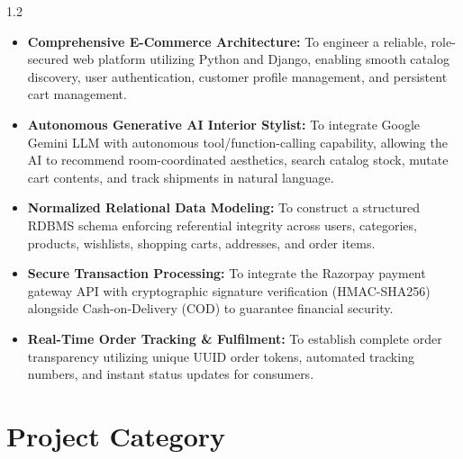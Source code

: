 \documentclass[12pt,a4paper]{article}
\begin{document}
{\begin{spacing}{1.2}
\begin{itemize}
    \setlength{\itemsep}{4pt}
    \setlength{\parskip}{0pt}
    \item \textbf{Comprehensive E-Commerce Architecture:} To engineer a reliable, role-secured web platform utilizing Python and Django, enabling smooth catalog discovery, user authentication, customer profile management, and persistent cart management.
    \item \textbf{Autonomous Generative AI Interior Stylist:} To integrate Google Gemini LLM with autonomous tool/function-calling capability, allowing the AI to recommend room-coordinated aesthetics, search catalog stock, mutate cart contents, and track shipments in natural language.
    \item \textbf{Normalized Relational Data Modeling:} To construct a structured RDBMS schema enforcing referential integrity across users, categories, products, wishlists, shopping carts, addresses, and order items.
    \item \textbf{Secure Transaction Processing:} To integrate the Razorpay payment gateway API with cryptographic signature verification (HMAC-SHA256) alongside Cash-on-Delivery (COD) to guarantee financial security.
    \item \textbf{Real-Time Order Tracking \& Fulfilment:} To establish complete order transparency utilizing unique UUID order tokens, automated tracking numbers, and instant status updates for consumers.
\end{itemize}

\end{spacing}
}

\vfill

\newpage



\section{Project Category}

\vspace{0.10in}
\end{document}
